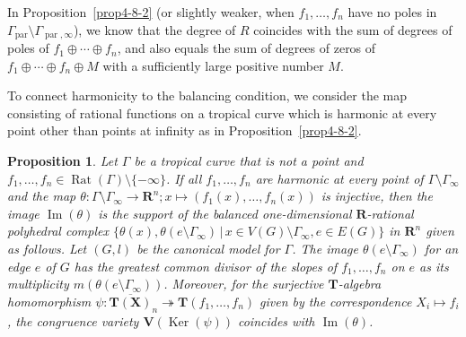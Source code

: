 \documentclass[a4paper,12pt]{amsart}
\newtheorem{prop}[dfn]{Proposition}
\def\Gamma{\varGamma}
\begin{document}
In Proposition~\ref{prop4-8-2} (or slightly weaker, when $f_1, \ldots, f_n$ have no poles in $\Gamma_{\operatorname{par}} \setminus \Gamma_{\operatorname{par}, \infty}$), we know that the degree of $R$ coincides with the sum of degrees of poles of $f_1 \oplus \cdots \oplus f_n$, and also equals the sum of degrees of zeros of $f_1 \oplus \cdots \oplus f_n \oplus M$ with a sufficiently large positive number $M$.

To connect harmonicity to the balancing condition, we consider the map consisting of rational functions on a tropical curve which is harmonic at every point other than points at infinity as in Proposition~\ref{prop4-8-2}.

\begin{prop}
    \label{prop4-8-4}
Let $\Gamma$ be a tropical curve that is not a point and $f_1, \ldots, f_n \in \operatorname{Rat}(\Gamma) \setminus \{ -\infty \}$.
If all $f_1, \ldots, f_n$ are harmonic at every point of $\Gamma \setminus \Gamma_{\infty}$ and the map $\theta : \Gamma \setminus \Gamma_{\infty} \to \boldsymbol{R}^n; x \mapsto (f_1(x), \ldots, f_n(x))$ is injective, then the image $\operatorname{Im} (\theta)$ is the support of the balanced one-dimensional $\boldsymbol{R}$-rational polyhedral complex $\{ \theta(x), \theta(e \setminus \Gamma_{\infty}) \,|\, x \in V(G) \setminus \Gamma_{\infty}, e \in E(G) \}$ in $\boldsymbol{R}^n$ given as follows.
Let $(G, l)$ be the canonical model for $\Gamma$.
The image $\theta(e \setminus \Gamma_{\infty})$ for an edge $e$ of $G$ has the greatest common divisor of the slopes of $f_1, \ldots, f_n$ on $e$ as its multiplicity $m(\theta(e \setminus \Gamma_{\infty}))$.
Moreover, for the surjective $\boldsymbol{T}$-algebra homomorphism $\psi : \overline{\boldsymbol{T}(\boldsymbol{X})}_n \twoheadrightarrow \boldsymbol{T}(f_1, \ldots, f_n)$ given by the correspondence $X_i \mapsto f_i$, the congruence variety $\boldsymbol{V}(\operatorname{Ker}(\psi))$ coincides with $\operatorname{Im}(\theta)$.
\end{prop}
\end{document}
